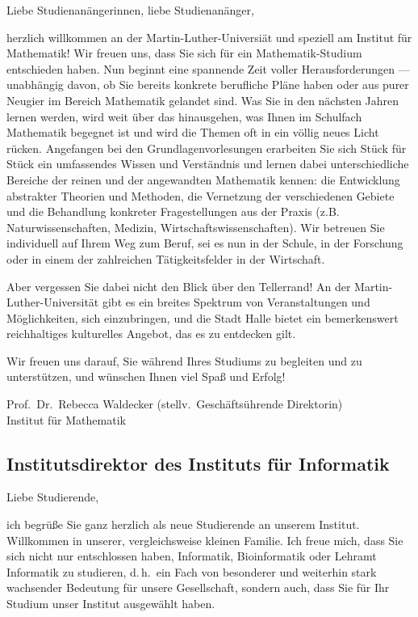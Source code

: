Liebe Studienanängerinnen, liebe Studienanänger,

herzlich willkommen an der Martin-Luther-Universiät und speziell am Institut für
Mathematik!  Wir freuen uns, dass Sie sich für ein Mathematik-Studium
entschieden haben.  Nun beginnt eine spannende Zeit voller Herausforderungen ---
unabhängig davon, ob Sie bereits konkrete berufliche Pläne haben oder aus purer
Neugier im Bereich Mathematik gelandet sind.  Was Sie in den nächsten Jahren
lernen werden, wird weit über das hinausgehen, was Ihnen im Schulfach Mathematik
begegnet ist und wird die Themen oft in ein völlig neues Licht rücken.
Angefangen bei den Grundlagenvorlesungen erarbeiten Sie sich Stück für Stück ein
umfassendes Wissen und Verständnis und lernen dabei unterschiedliche Bereiche
der reinen und der angewandten Mathematik kennen: die Entwicklung abstrakter
Theorien und Methoden, die Vernetzung der verschiedenen Gebiete und die
Behandlung konkreter Fragestellungen aus der Praxis (z.B. Naturwissenschaften,
Medizin, Wirtschaftswissenschaften).  Wir betreuen Sie individuell auf Ihrem Weg
zum Beruf, sei es nun in der Schule, in der Forschung oder in einem der
zahlreichen Tätigkeitsfelder in der Wirtschaft.

Aber vergessen Sie dabei nicht den Blick über den Tellerrand! An der
Martin-Luther-Universität gibt es ein breites Spektrum von Veranstaltungen und
Möglichkeiten, sich einzubringen, und die Stadt Halle bietet ein bemerkenswert
reichhaltiges kulturelles Angebot, das es zu entdecken gilt.

Wir freuen uns darauf, Sie während Ihres Studiums zu begleiten und zu
unterstützen, und wünschen Ihnen viel Spaß und Erfolg!

Prof.\ Dr.\ Rebecca Waldecker (stellv.\ Geschäftsührende Direktorin)\\
Institut für Mathematik


\subsection{Institutsdirektor des Instituts für Informatik}

Liebe Studierende,

ich begrüße Sie ganz herzlich als neue Studierende an unserem Institut.
Willkommen in unserer, vergleichsweise kleinen Familie. Ich freue mich, dass Sie
sich nicht nur entschlossen haben, Informatik, Bioinformatik oder Lehramt
Informatik zu studieren, d.\,h.\ ein Fach von  besonderer und weiterhin stark
wachsender Bedeutung für unsere Gesellschaft, sondern auch, dass Sie für Ihr
Studium unser Institut ausgewählt haben.

